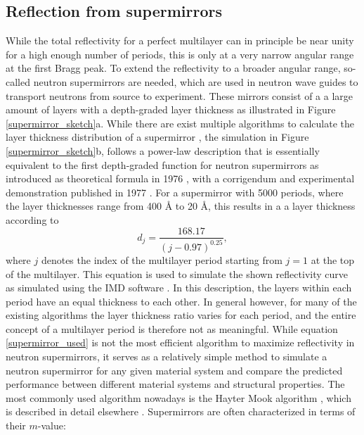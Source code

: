 \subsection{Reflection from supermirrors}
While the total reflectivity for a perfect multilayer can in principle be near unity for a high enough number of periods, this is only at a very narrow angular range at the first Bragg peak. To extend the reflectivity to a broader angular range, so-called neutron supermirrors are needed, which are used in neutron wave guides to transport neutrons from source to experiment. These mirrors consist of a a large amount of layers with a depth-graded layer thickness as illustrated in Figure \ref{supermirror_sketch}a. While there are exist multiple algorithms to calculate the layer thickness distribution of a supermirror \cite{hayter_mook, supermirror_algorithm1, supermirror_algorithm2, supermirror_algorithm3}, the simulation in Figure  \ref{supermirror_sketch}b, follows a power-law description that is essentially equivalent to the first depth-graded function for neutron supermirrors as introduced as theoretical formula in 1976 \cite{mezei1976novel}, with a corrigendum  and experimental demonstration published in 1977 \cite{original_supermirror}. For a supermirror with 5000 periods, where the layer thicknesses range from 400 Å to 20 Å, this results in a a layer thickness according to
\begin{equation}\label{supermirror_used}
	d_j = \frac{168.17}{(j-0.97)^{0.25}},
\end{equation}
where $j$ denotes the index of the multilayer period starting from $j = 1$ at the top of the multilayer. This equation is used to simulate the shown reflectivity curve as simulated using the IMD software \cite{IMD}. In this description, the layers within each period have an equal thickness to each other. In general however, for many of the existing algorithms the layer thickness ratio varies for each period, and the entire concept of a multilayer period is therefore not as meaningful. While equation \ref{supermirror_used} is not the most efficient algorithm to maximize reflectivity in neutron supermirrors, it serves as a relatively simple method to simulate a neutron supermirror for any given material system and compare the predicted performance between different material systems and structural properties. The most commonly used algorithm nowadays is the Hayter Mook algorithm \cite{supermirror_algorithm}, which is described in detail elsewhere \cite{hayter_mook}. Supermirrors are often characterized in terms of their $m$-value:
